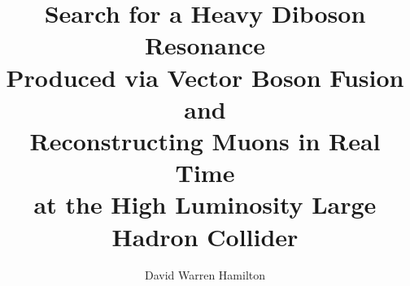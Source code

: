 \documentclass[PhD]{uclathes}
\title{
Search for a Heavy Diboson Resonance\\
Produced via Vector Boson Fusion\\
and\\
Reconstructing Muons in Real Time\\
at the High Luminosity Large Hadron Collider
}
\author{David Warren Hamilton}
\begin{document}
\makeintropages













\appendix




\end{document}
